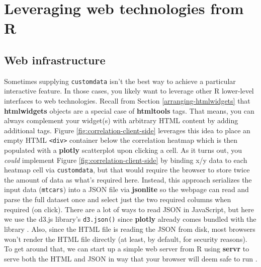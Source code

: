 \documentclass[
  12pt,
]{krantz}
\begin{document}
\hypertarget{client-side}{%
\chapter{Leveraging web technologies from R}\label{client-side}}

\hypertarget{web-infrastructure}{%
\section{Web infrastructure}\label{web-infrastructure}}

Sometimes supplying \texttt{customdata} isn't the best way to achieve a particular interactive feature. In those cases, you likely want to leverage other R lower-level interfaces to web technologies. Recall from Section \ref{arranging-htmlwidgets} that \textbf{htmlwidgets} objects are a special case of \textbf{htmltools} tags. That means, you can always complement your widget(s) with arbitrary HTML content by adding additional tags. Figure \ref{fig:correlation-client-side} leverages this idea to place an empty HTML \texttt{\textless{}div\textgreater{}} container below the correlation heatmap which is then populated with a \textbf{plotly} scatterplot upon clicking a cell. As it turns out, you \emph{could} implement Figure \ref{fig:correlation-client-side} by binding x/y data to each heatmap cell via \texttt{customdata}, but that would require the browser to store twice the amount of data as what's required here. Instead, this approach serializes the input data (\texttt{mtcars}) into a JSON file via \textbf{jsonlite} so the webpage can read and parse the full dataset once and select just the two required columns when required (on click). There are a lot of ways to read JSON in JavaScript, but here we use the d3.js library's \texttt{d3.json()} since \textbf{plotly} already comes bundled with the library \citep{d3js}. Also, since the HTML file is reading the JSON from disk, most browsers won't render the HTML file directly (at least, by default, for security reasons). To get around that, we can start up a simple web server from R using \textbf{servr} to serve both the HTML and JSON in way that your browser will deem safe to run \citep{servr}.
\end{document}
